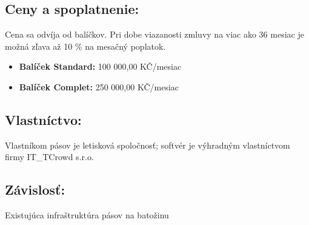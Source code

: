 \documentclass[a4paper, 11pt]{article}
\begin{document}
\subsection*{Ceny a spoplatnenie:}
Cena sa odvíja od balíčkov. Pri dobe viazanosti zmluvy na viac ako 36 mesiac je možná zľava až 10 \% na mesačný poplatok.
\begin{itemize}
\item \textbf{Balíček Standard:} 100 000,00 KČ/mesiac
\item \textbf{Balíček Complet:} 250 000,00 KČ/mesiac
\end{itemize}
\subsection*{Vlastníctvo:}
Vlastníkom pásov je letisková spoločnosť; softvér je výhradným vlastníctvom firmy IT\_TCrowd s.r.o.
\subsection*{Závislosť:}
Existujúca infraštruktúra pásov na batožinu
\end{document}
